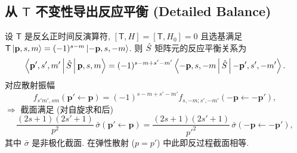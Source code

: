 \subsection{从 \texorpdfstring{$\mathsf{T}$}{T} 不变性导出反应平衡 (Detailed Balance)}\label{sec:inv-dbalance}

\begin{theorem}[反应平衡]\label{thm:inv-detailed-balance}
设 $\mathsf{T}$ 是反幺正时间反演算符, $[\mathsf{T},H]=[\mathsf{T},H_0]=0$ 且选基满足 $\mathsf{T}\ket{\mathbf{p},s,m}=(-1)^{s-m}\ket{-\mathbf{p},s,-m}$. 则 $\hat{S}$ 矩阵元的反应平衡关系为
\begin{equation}\label{eq:inv-db-S}
\left\langle \mathbf{p}',s',m' \,\middle|\, \hat{S} \,\middle|\, \mathbf{p},s,m \right\rangle=(-1)^{s-m+s'-m'}\left\langle -\mathbf{p},s,-m \,\middle|\, \hat{S} \,\middle|\, -\mathbf{p}',s',-m' \right\rangle.
\end{equation}
对应散射振幅
\begin{equation}\label{eq:inv-db-f}
f_{s'm',sm}(\mathbf{p}'\leftarrow \mathbf{p})=(-1)^{s-m+s'-m'}f_{s,-m;s',-m'}(-\mathbf{p}\leftarrow -\mathbf{p}'),
\end{equation}
$\Rightarrow$ 截面满足 (对自旋求和后)
\begin{equation}\label{eq:inv-db-sigma}
\frac{(2s+1)(2s'+1)}{p^2}\,\bar{\sigma}(\mathbf{p}'\leftarrow \mathbf{p})=\frac{(2s+1)(2s'+1)}{p'^2}\,\bar{\sigma}(-\mathbf{p}\leftarrow -\mathbf{p}'),
\end{equation}
其中 $\bar\sigma$ 是非极化截面. 在弹性散射 ($p=p'$) 中此即反过程截面相等.
\end{theorem}

